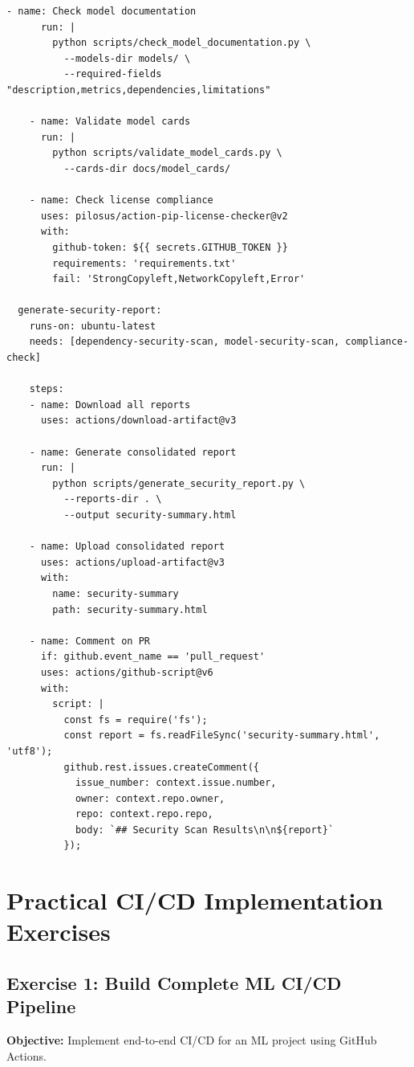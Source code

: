 \begin{lstlisting}[style=yaml, caption=Security Scanning in CI/CD]
    - name: Check model documentation
      run: |
        python scripts/check_model_documentation.py \
          --models-dir models/ \
          --required-fields "description,metrics,dependencies,limitations"

    - name: Validate model cards
      run: |
        python scripts/validate_model_cards.py \
          --cards-dir docs/model_cards/

    - name: Check license compliance
      uses: pilosus/action-pip-license-checker@v2
      with:
        github-token: ${{ secrets.GITHUB_TOKEN }}
        requirements: 'requirements.txt'
        fail: 'StrongCopyleft,NetworkCopyleft,Error'

  generate-security-report:
    runs-on: ubuntu-latest
    needs: [dependency-security-scan, model-security-scan, compliance-check]

    steps:
    - name: Download all reports
      uses: actions/download-artifact@v3

    - name: Generate consolidated report
      run: |
        python scripts/generate_security_report.py \
          --reports-dir . \
          --output security-summary.html

    - name: Upload consolidated report
      uses: actions/upload-artifact@v3
      with:
        name: security-summary
        path: security-summary.html

    - name: Comment on PR
      if: github.event_name == 'pull_request'
      uses: actions/github-script@v6
      with:
        script: |
          const fs = require('fs');
          const report = fs.readFileSync('security-summary.html', 'utf8');
          github.rest.issues.createComment({
            issue_number: context.issue.number,
            owner: context.repo.owner,
            repo: context.repo.repo,
            body: `## Security Scan Results\n\n${report}`
          });
\end{lstlisting}

\section{Practical CI/CD Implementation Exercises}

\subsection{Exercise 1: Build Complete ML CI/CD Pipeline}

\textbf{Objective:} Implement end-to-end CI/CD for an ML project using GitHub Actions.

